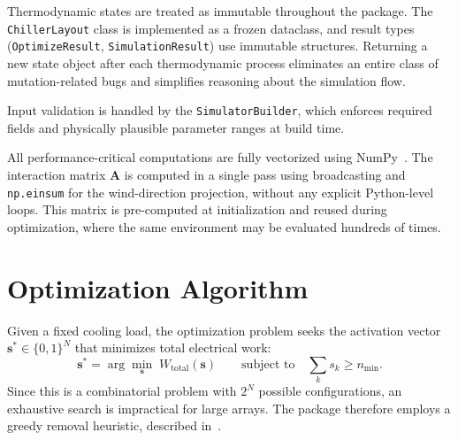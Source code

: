 \documentclass[11pt, a4paper]{article}
\begin{document}
Thermodynamic states are treated as immutable throughout the package.
The \texttt{ChillerLayout} class is implemented as a frozen dataclass, and result types (\texttt{OptimizeResult}, \texttt{SimulationResult}) use immutable structures.
Returning a new state object after each thermodynamic process eliminates an entire class of mutation-related bugs and simplifies reasoning about the simulation flow.

Input validation is handled by the \texttt{SimulatorBuilder}, which enforces required fields and physically plausible parameter ranges at build time.

All performance-critical computations are fully vectorized using NumPy~\cite{harris2020numpy}.
The interaction matrix $\mathbf{A}$ is computed in a single pass using broadcasting and \texttt{np.einsum} for the wind-direction projection, without any explicit Python-level loops.
This matrix is pre-computed at initialization and reused during optimization, where the same environment may be evaluated hundreds of times.

\section{Optimization Algorithm}
\label{sec:optimization}

Given a fixed cooling load, the optimization problem seeks the activation vector $\mathbf{s}^{*} \in \{0,1\}^N$ that minimizes total electrical work:
\begin{equation}
    \label{eq:optimization}
    \mathbf{s}^{*} = \arg\min_{\mathbf{s}} \; W_{\mathrm{total}}(\mathbf{s})
    \qquad \text{subject to} \quad \sum_{k} s_k \geq n_{\min}.
\end{equation}
Since this is a combinatorial problem with $2^N$ possible configurations, an exhaustive search is impractical for large arrays.
The package therefore employs a greedy removal heuristic, described in~.
\end{document}
